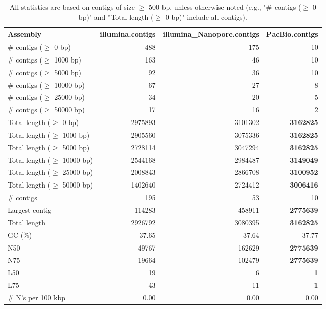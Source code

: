 \documentclass[12pt,a4paper]{article}
\begin{document}
\begin{table}[ht]
\begin{center}
\caption{All statistics are based on contigs of size $\geq$ 500 bp, unless otherwise noted (e.g., "\# contigs ($\geq$ 0 bp)" and "Total length ($\geq$ 0 bp)" include all contigs).}
\begin{tabular}{|l*{3}{|r}|}
\hline
Assembly & illumina.contigs & illumina\_Nanopore.contigs & PacBio.contigs \\ \hline
\# contigs ($\geq$ 0 bp) & 488 & 175 & 10 \\ \hline
\# contigs ($\geq$ 1000 bp) & 163 & 46 & 10 \\ \hline
\# contigs ($\geq$ 5000 bp) & 92 & 36 & 10 \\ \hline
\# contigs ($\geq$ 10000 bp) & 67 & 27 & 8 \\ \hline
\# contigs ($\geq$ 25000 bp) & 34 & 20 & 5 \\ \hline
\# contigs ($\geq$ 50000 bp) & 17 & 16 & 2 \\ \hline
Total length ($\geq$ 0 bp) & 2975893 & 3101302 & {\bf 3162825} \\ \hline
Total length ($\geq$ 1000 bp) & 2905560 & 3075336 & {\bf 3162825} \\ \hline
Total length ($\geq$ 5000 bp) & 2728114 & 3047294 & {\bf 3162825} \\ \hline
Total length ($\geq$ 10000 bp) & 2544168 & 2984487 & {\bf 3149049} \\ \hline
Total length ($\geq$ 25000 bp) & 2008843 & 2866708 & {\bf 3100952} \\ \hline
Total length ($\geq$ 50000 bp) & 1402640 & 2724412 & {\bf 3006416} \\ \hline
\# contigs & 195 & 53 & 10 \\ \hline
Largest contig & 114283 & 458911 & {\bf 2775639} \\ \hline
Total length & 2926792 & 3080395 & {\bf 3162825} \\ \hline
GC (\%) & 37.65 & 37.64 & 37.77 \\ \hline
N50 & 49767 & 162629 & {\bf 2775639} \\ \hline
N75 & 19664 & 102479 & {\bf 2775639} \\ \hline
L50 & 19 & 6 & {\bf 1} \\ \hline
L75 & 43 & 11 & {\bf 1} \\ \hline
\# N's per 100 kbp & 0.00 & 0.00 & 0.00 \\ \hline
\end{tabular}
\end{center}
\end{table}
\end{document}
